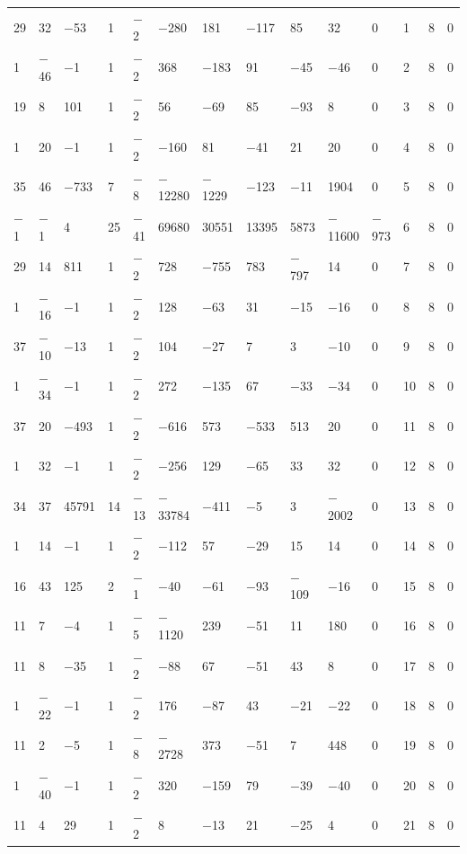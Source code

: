 \documentclass[pdftex]{sigma}
\numberwithin{equation}{section}
\theoremstyle{definition}
\numberwithin{table}{section}
\begin{document}
{\begin{paracol}{3}
\begin{supertabular}{|w{c}{.32cm}w{c}{.32cm}w{c}{.32cm}@{\hspace{.5cm}}w{c}{.2cm}w{c}{.2cm}|@{\hspace{\tabcolsep}}HHHHHHw{c}{.17cm}w{c}{.17cm}w{c}{.17cm}|}
			29 & 32 & $-$53 & 1 & $-$2 & $-$280 & 181 & $-$117 & 85 & 32 & 0 & 1 & 8 & 0 \\
			1 & $-$46 & $-$1 & 1 & $-$2 & 368 & $-$183 & 91 & $-$45 & $-$46 & 0 & 2 & 8 & 0 \\
			19 & 8 & 101 & 1 & $-$2 & 56 & $-$69 & 85 & $-$93 & 8 & 0 & 3 & 8 & 0 \\
			1 & 20 & $-$1 & 1 & $-$2 & $-$160 & 81 & $-$41 & 21 & 20 & 0 & 4 & 8 & 0 \\
			35 & 46 & $-$733 & 7 & $-$8 & $-$12280 & $-$1229 & $-$123 & $-$11 & 1904 & 0 & 5 & 8 & 0 \\
			$-$1 & $-$1 & 4 & 25 & $-$41 & 69680 & 30551 & 13395 & 5873 & $-$11600 & $-$973 & 6 & 8 & 0 \\
			29 & 14 & 811 & 1 & $-$2 & 728 & $-$755 & 783 & $-$797 & 14 & 0 & 7 & 8 & 0 \\
			1 & $-$16 & $-$1 & 1 & $-$2 & 128 & $-$63 & 31 & $-$15 & $-$16 & 0 & 8 & 8 & 0 \\
			37 & $-$10 & $-$13 & 1 & $-$2 & 104 & $-$27 & 7 & 3 & $-$10 & 0 & 9 & 8 & 0 \\
			1 & $-$34 & $-$1 & 1 & $-$2 & 272 & $-$135 & 67 & $-$33 & $-$34 & 0 & 10 & 8 & 0 \\
			37 & 20 & $-$493 & 1 & $-$2 & $-$616 & 573 & $-$533 & 513 & 20 & 0 & 11 & 8 & 0 \\
			1 & 32 & $-$1 & 1 & $-$2 & $-$256 & 129 & $-$65 & 33 & 32 & 0 & 12 & 8 & 0 \\
			34 & 37 & 45791 & 14 & $-$13 & $-$33784 & $-$411 & $-$5 & 3 & $-$2002 & 0 & 13 & 8 & 0 \\
			1 & 14 & $-$1 & 1 & $-$2 & $-$112 & 57 & $-$29 & 15 & 14 & 0 & 14 & 8 & 0 \\
			16 & 43 & 125 & 2 & $-$1 & $-$40 & $-$61 & $-$93 & $-$109 & $-$16 & 0 & 15 & 8 & 0 \\
			11 & 7 & $-$4 & 1 & $-$5 & $-$1120 & 239 & $-$51 & 11 & 180 & 0 & 16 & 8 & 0 \\
			11 & 8 & $-$35 & 1 & $-$2 & $-$88 & 67 & $-$51 & 43 & 8 & 0 & 17 & 8 & 0 \\
			1 & $-$22 & $-$1 & 1 & $-$2 & 176 & $-$87 & 43 & $-$21 & $-$22 & 0 & 18 & 8 & 0 \\
			11 & 2 & $-$5 & 1 & $-$8 & $-$2728 & 373 & $-$51 & 7 & 448 & 0 & 19 & 8 & 0 \\
			1 & $-$40 & $-$1 & 1 & $-$2 & 320 & $-$159 & 79 & $-$39 & $-$40 & 0 & 20 & 8 & 0 \\
			11 & 4 & 29 & 1 & $-$2 & 8 & $-$13 & 21 & $-$25 & 4 & 0 & 21 & 8 & 0 \\

\end{supertabular}
\end{paracol}}
\end{document}
